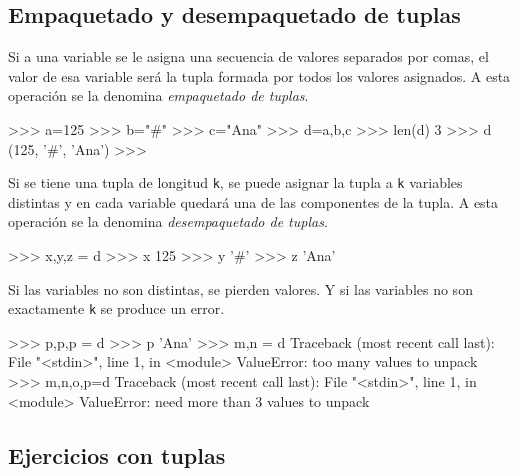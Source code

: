 \subsection{Empaquetado y desempaquetado de tuplas}
Si a una variable se le asigna una secuencia de valores separados por comas,
el valor de esa variable será la tupla formada por todos los valores asignados.
A esta operación se la denomina {\it empaquetado de tuplas}.

\begin{codigo-python-sn}
>>> a=125
>>> b="#"
>>> c="Ana"
>>> d=a,b,c
>>> len(d)
3
>>> d
(125, '#', 'Ana')
>>>
\end{codigo-python-sn}

Si se tiene una tupla de longitud \lstinline+k+, se puede asignar
la tupla a \lstinline+k+ variables distintas y en cada variable quedará
una de las componentes de la tupla. A esta operación se la denomina
{\it desempaquetado de tuplas}.

\begin{codigo-python-sn}
>>> x,y,z = d
>>> x
125
>>> y
'#'
>>> z
'Ana'
\end{codigo-python-sn}

\begin{atencion}
Si las variables no son distintas, se pierden valores. Y si las variables
no son exactamente \lstinline+k+ se produce un error.

\begin{codigo-python-sn}
>>> p,p,p = d
>>> p
'Ana'
>>> m,n = d
Traceback (most recent call last):
  File "<stdin>", line 1, in <module>
ValueError: too many values to unpack
>>> m,n,o,p=d
Traceback (most recent call last):
  File "<stdin>", line 1, in <module>
ValueError: need more than 3 values to unpack
\end{codigo-python-sn}
\end{atencion}

\subsection{Ejercicios con tuplas}


